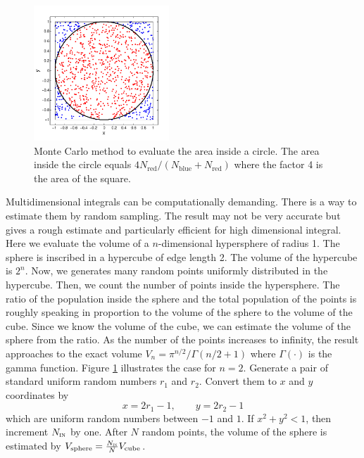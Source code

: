 \bigskip
\begin{example}\label{ex:n_ball}

\begin{figure}
	\centering
	\includegraphics[width=2.0in]{15.Random-Numbers/circle.pdf}
	\caption{Monte Carlo method to evaluate the area inside a circle.  The area inside the circle equals $4 N_\text{red}/(N_\text{blue}+N_\text{red})$ where the factor 4 is the area of the square.}
	\label{fig:MC_circle}
\end{figure}

Multidimensional integrals can be computationally demanding.  There is a way to estimate them by random sampling.  The result may not be very accurate but gives a rough estimate and particularly efficient for high dimensional integral.  Here we evaluate the volume of a $n$-dimensional hypersphere of radius 1.  The sphere is inscribed in a hypercube of edge length 2. The volume of the hypercube is $2^n$.  Now, we generates many random points uniformly distributed in the hypercube. Then, we count the number of points inside the hypersphere.  The ratio of the population inside the sphere and the total population of the points is roughly speaking in proportion to the volume of the sphere to the volume of the cube. Since we know the volume of the cube, we can estimate the volume of the sphere from the ratio. As the number of the points increases to infinity, the result approaches to the exact volume $V_n=\pi^{n/2} / \Gamma(n/2+1)$ where $\Gamma(\cdot)$ is the gamma function.\cite{gamma_function} Figure \ref{fig:MC_circle} illustrates  the case for $n=2$. Generate a pair of standard uniform random numbers $r_1$ and $r_2$.  Convert them to $x$ and $y$ coordinates by 
\begin{equation}
x = 2 r_1 - 1, \qquad y=2 r_2-1
\end{equation}
which are uniform random numbers between $-1$ and $1$.  If $x^2+y^2 < 1$, then increment $N_\textsc{in}$ by one.  After $N$ random points, the volume of the sphere is estimated by $V_\text{sphere} = \frac{N_\textsc{in}}{N} V_\text{cube}$.


\end{example}
